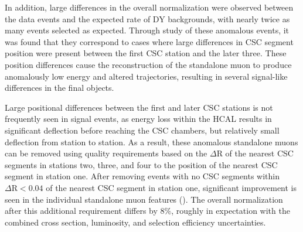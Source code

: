 In addition, large differences in the overall normalization were observed between the data events and the expected rate of DY backgrounds, with nearly twice as many events selected as expected.
Through study of these anomalous events, it was found that they correspond to cases where large differences in CSC segment position were present between the first CSC station and the later three.
These position differences cause the reconstruction of the standalone muon to produce anomalously low energy and altered trajectories, resulting in several signal-like differences in the final objects. 

Large positional differences between the first and later CSC stations is not frequently seen in signal events, as energy loss within the HCAL results in significant deflection before reaching the CSC chambers, but relatively small deflection from station to station. 
As a result, these anomalous standalone muons can be removed using quality requirements based on the $\Delta$R of the nearest CSC segments in stations two, three, and four to the position of the nearest CSC segment in station one.
After removing events with no CSC segments within $\Delta\mathrm{R}<0.04$ of the nearest CSC segment in station one, significant improvement is seen in the individual standalone muon features ().
The overall normalization after this additional requirement differs by $8\%$, roughly in expectation with the combined cross section, luminosity, and selection efficiency uncertainties.

